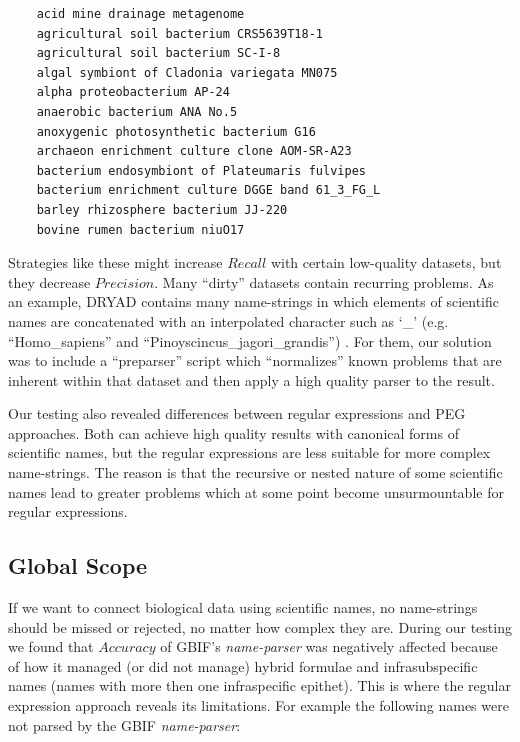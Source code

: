 \documentclass{bmcart}
\begin{document}
\begin{verbatim}
    acid mine drainage metagenome
    agricultural soil bacterium CRS5639T18-1
    agricultural soil bacterium SC-I-8
    algal symbiont of Cladonia variegata MN075
    alpha proteobacterium AP-24
    anaerobic bacterium ANA No.5
    anoxygenic photosynthetic bacterium G16
    archaeon enrichment culture clone AOM-SR-A23
    bacterium endosymbiont of Plateumaris fulvipes
    bacterium enrichment culture DGGE band 61_3_FG_L
    barley rhizosphere bacterium JJ-220
    bovine rumen bacterium niuO17
\end{verbatim}

\vspace{0.5cm}

Strategies like these might increase $Recall$ with certain low-quality datasets, but they decrease $Precision$. Many ``dirty'' datasets contain recurring problems. As an example, DRYAD contains many name-strings in which elements of scientific names are concatenated with an interpolated character such as `\_’ (e.g. ``Homo\_sapiens'' and ``Pinoyscincus\_jagori\_grandis'') \cite{Patterson2016}. For them, our solution was to include a ``preparser'' script which ``normalizes'' known problems that are inherent within that dataset and then apply a high quality parser to the result.

Our testing also revealed differences between regular expressions and PEG approaches. Both can achieve high quality results with canonical forms of scientific names, but the regular expressions are less suitable for more complex name-strings. The reason is that the recursive or nested nature of some scientific names lead to greater problems which at some point become unsurmountable for regular expressions.

\subsection*{Global Scope}

If we want to connect biological data using scientific names, no name-strings should be missed or rejected, no matter how complex they are. During our testing we found that $Accuracy$ of GBIF's \textit{name-parser} was negatively affected because of how it managed (or did not manage) hybrid formulae and infrasubspecific names (names with more then one infraspecific epithet). This is where the regular expression approach reveals its limitations. For example the following names were not parsed by the GBIF \textit{name-parser}:
\end{document}
